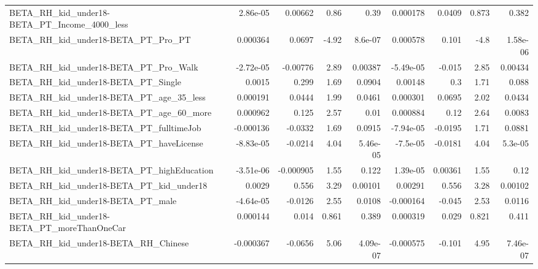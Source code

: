 \begin{tabular}{lrrrrrrrr}
BETA\_RH\_kid\_under18-BETA\_PT\_Income\_4000\_less       &    2.86e-05 &      0.00662 &      0.86 &     0.39 &   0.000178 &      0.0409 &        0.873 &         0.382 \\
BETA\_RH\_kid\_under18-BETA\_PT\_Pro\_PT                 &    0.000364 &       0.0697 &     -4.92 &  8.6e-07 &   0.000578 &       0.101 &         -4.8 &      1.58e-06 \\
BETA\_RH\_kid\_under18-BETA\_PT\_Pro\_Walk               &   -2.72e-05 &     -0.00776 &      2.89 &  0.00387 &  -5.49e-05 &      -0.015 &         2.85 &       0.00434 \\
BETA\_RH\_kid\_under18-BETA\_PT\_Single                 &      0.0015 &        0.299 &      1.69 &   0.0904 &    0.00148 &         0.3 &         1.71 &         0.088 \\
BETA\_RH\_kid\_under18-BETA\_PT\_age\_35\_less            &    0.000191 &       0.0444 &      1.99 &   0.0461 &   0.000301 &      0.0695 &         2.02 &        0.0434 \\
BETA\_RH\_kid\_under18-BETA\_PT\_age\_60\_more            &    0.000962 &        0.125 &      2.57 &     0.01 &   0.000884 &        0.12 &         2.64 &        0.0083 \\
BETA\_RH\_kid\_under18-BETA\_PT\_fulltimeJob            &   -0.000136 &      -0.0332 &      1.69 &   0.0915 &  -7.94e-05 &     -0.0195 &         1.71 &        0.0881 \\
BETA\_RH\_kid\_under18-BETA\_PT\_haveLicense            &   -8.83e-05 &      -0.0214 &      4.04 & 5.46e-05 &   -7.5e-05 &     -0.0181 &         4.04 &       5.3e-05 \\
BETA\_RH\_kid\_under18-BETA\_PT\_highEducation          &   -3.51e-06 &    -0.000905 &      1.55 &    0.122 &   1.39e-05 &     0.00361 &         1.55 &          0.12 \\
BETA\_RH\_kid\_under18-BETA\_PT\_kid\_under18            &      0.0029 &        0.556 &      3.29 &  0.00101 &    0.00291 &       0.556 &         3.28 &       0.00102 \\
BETA\_RH\_kid\_under18-BETA\_PT\_male                   &   -4.64e-05 &      -0.0126 &      2.55 &   0.0108 &  -0.000164 &      -0.045 &         2.53 &        0.0116 \\
BETA\_RH\_kid\_under18-BETA\_PT\_moreThanOneCar         &    0.000144 &        0.014 &     0.861 &    0.389 &   0.000319 &       0.029 &        0.821 &         0.411 \\
BETA\_RH\_kid\_under18-BETA\_RH\_Chinese                &   -0.000367 &      -0.0656 &      5.06 & 4.09e-07 &  -0.000575 &      -0.101 &         4.95 &      7.46e-07 \\

\end{tabular}
